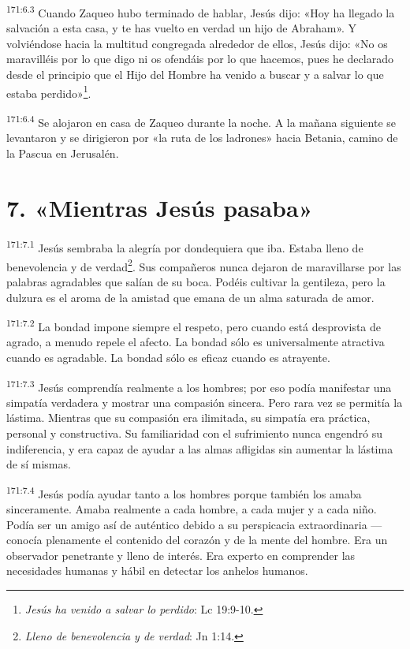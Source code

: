 \par 
\textsuperscript{171:6.3} Cuando Zaqueo hubo terminado de hablar, Jesús dijo: «Hoy ha llegado la salvación a esta casa, y te has vuelto en verdad un hijo de Abraham». Y volviéndose hacia la multitud congregada alrededor de ellos, Jesús dijo: «No os maravilléis por lo que digo ni os ofendáis por lo que hacemos, pues he declarado desde el principio que el Hijo del Hombre ha venido a buscar y a salvar lo que estaba perdido»\footnote{\textit{Jesús ha venido a salvar lo perdido}: Lc 19:9-10.}.

\par 
\textsuperscript{171:6.4} Se alojaron en casa de Zaqueo durante la noche. A la mañana siguiente se levantaron y se dirigieron por «la ruta de los ladrones» hacia Betania, camino de la Pascua en Jerusalén.

\section*{7. «Mientras Jesús pasaba»}
\par 
\textsuperscript{171:7.1} Jesús sembraba la alegría por dondequiera que iba. Estaba lleno de benevolencia y de verdad\footnote{\textit{Lleno de benevolencia y de verdad}: Jn 1:14.}. Sus compañeros nunca dejaron de maravillarse por las palabras agradables que salían de su boca. Podéis cultivar la gentileza, pero la dulzura es el aroma de la amistad que emana de un alma saturada de amor.

\par 
\textsuperscript{171:7.2} La bondad impone siempre el respeto, pero cuando está desprovista de agrado, a menudo repele el afecto. La bondad sólo es universalmente atractiva cuando es agradable. La bondad sólo es eficaz cuando es atrayente.

\par 
\textsuperscript{171:7.3} Jesús comprendía realmente a los hombres; por eso podía manifestar una simpatía verdadera y mostrar una compasión sincera. Pero rara vez se permitía la lástima. Mientras que su compasión era ilimitada, su simpatía era práctica, personal y constructiva. Su familiaridad con el sufrimiento nunca engendró su indiferencia, y era capaz de ayudar a las almas afligidas sin aumentar la lástima de sí mismas.

\par 
\textsuperscript{171:7.4} Jesús podía ayudar tanto a los hombres porque también los amaba sinceramente. Amaba realmente a cada hombre, a cada mujer y a cada niño. Podía ser un amigo así de auténtico debido a su perspicacia extraordinaria ---conocía plenamente el contenido del corazón y de la mente del hombre. Era un observador penetrante y lleno de interés. Era experto en comprender las necesidades humanas y hábil en detectar los anhelos humanos.

